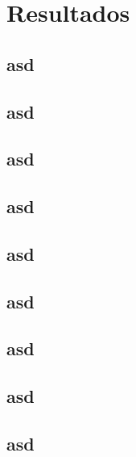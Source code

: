 \chapter{Resultados}\label{CAP7}

\section{asd}
\section{asd}
\section{asd}
\section{asd}
\section{asd}
\section{asd}
\section{asd}
\section{asd}
\section{asd}

